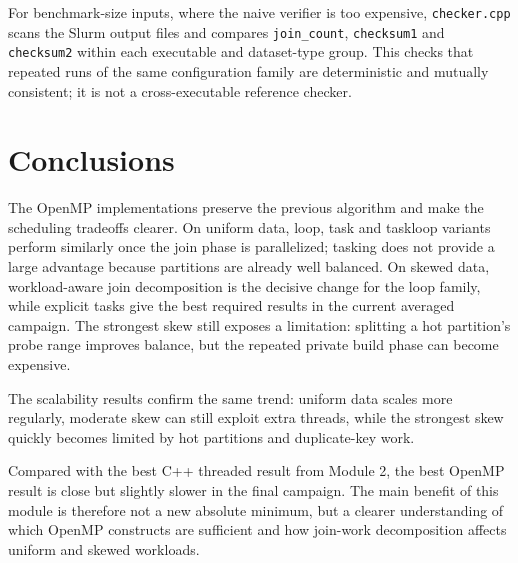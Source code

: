\documentclass[11pt,a4paper]{article}
\begin{document}
For benchmark-size inputs, where the naive verifier is too expensive, \texttt{checker.cpp} scans the Slurm output files and compares \texttt{join\_count}, \texttt{checksum1} and \texttt{checksum2} within each executable and dataset-type group. This checks that repeated runs of the same configuration family are deterministic and mutually consistent; it is not a cross-executable reference checker.

\section{Conclusions}
The OpenMP implementations preserve the previous algorithm and make the scheduling tradeoffs clearer. On uniform data, loop, task and taskloop variants perform similarly once the join phase is parallelized; tasking does not provide a large advantage because partitions are already well balanced. On skewed data, workload-aware join decomposition is the decisive change for the loop family, while explicit tasks give the best required results in the current averaged campaign. The strongest skew still exposes a limitation: splitting a hot partition's probe range improves balance, but the repeated private build phase can become expensive.

The scalability results confirm the same trend: uniform data scales more regularly, moderate skew can still exploit extra threads, while the strongest skew quickly becomes limited by hot partitions and duplicate-key work.

Compared with the best C++ threaded result from Module 2, the best OpenMP result is close but slightly slower in the final campaign. The main benefit of this module is therefore not a new absolute minimum, but a clearer understanding of which OpenMP constructs are sufficient and how join-work decomposition affects uniform and skewed workloads.
\end{document}
